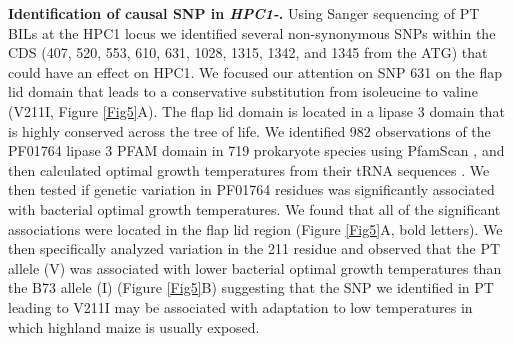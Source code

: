 \documentclass[9pt,twocolumn,twoside,lineno]{BioRxiv}
\begin{document}

\textbf{Identification of causal SNP in \textit{HPC1-}.} Using Sanger sequencing of PT BILs at the HPC1 locus we identified several non-synonymous SNPs within the CDS (407, 520, 553, 610, 631, 1028, 1315, 1342, and 1345 from the ATG) that could have an effect on HPC1.
We focused our attention on SNP 631 on the flap lid domain that leads to a conservative substitution from isoleucine to valine (V211I, Figure \ref{Fig5}A).  
The flap lid domain is located in a lipase 3 domain that is highly conserved across the tree of life. 
We identified 982 observations of the PF01764 lipase 3 PFAM domain in 719 prokaryote species using PfamScan \cite{Potter2018-tk, El-Gebali2019-pw}, and then calculated optimal growth temperatures from their tRNA sequences \cite{Cimen2020-dm}.
We then tested if genetic variation in PF01764 residues was significantly associated with bacterial optimal growth temperatures. 
We found that all of the significant associations were located in the flap lid region  (Figure \ref{Fig5}A, bold letters).  
We then specifically analyzed variation in the 211 residue and observed that the PT allele (V) was associated with lower bacterial optimal growth temperatures than the B73 allele (I) (Figure \ref{Fig5}B) suggesting that the SNP we identified in PT leading to V211I may be associated with adaptation to low temperatures in which highland maize is usually exposed.
\end{document}
